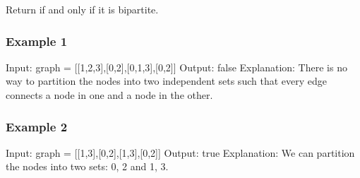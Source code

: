 \documentclass[letterpaper,12pt,english]{book}
\begin{document}
\sphinxAtStartPar
Return  if and only if it is bipartite.


\subsubsection{Example 1}
\label{\detokenize{Graph/785_Is_Graph_Bipartite:example-1}}
\sphinxAtStartPar
{}

\begin{sphinxVerbatim}[commandchars=\\\{\}]
Input: graph = [[1,2,3],[0,2],[0,1,3],[0,2]]
Output: false
Explanation: There is no way to partition the nodes into two independent sets such that every edge connects a node in one and a node in the other.
\end{sphinxVerbatim}


\subsubsection{Example 2}
\label{\detokenize{Graph/785_Is_Graph_Bipartite:example-2}}
\sphinxAtStartPar
{}

\begin{sphinxVerbatim}[commandchars=\\\{\}]
Input: graph = [[1,3],[0,2],[1,3],[0,2]]
Output: true
Explanation: We can partition the nodes into two sets: \PYGZob{}0, 2\PYGZcb{} and \PYGZob{}1, 3\PYGZcb{}.
\end{sphinxVerbatim}
\end{document}
